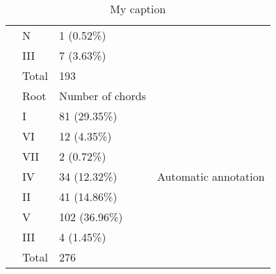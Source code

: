 \begin{table}[]
{\begin{tabular}{|l|l|l|l}
 & N & 1 (0.52\%) & \multicolumn{1}{l|}{} \\ \cline{2-3}
 & III & 7 (3.63\%) & \multicolumn{1}{l|}{} \\ \cline{2-3}
 & Total & 193 & \multicolumn{1}{l|}{} \\ \cline{2-4}
 & Root & Number of chords & \multirow{9}{*}{Automatic annotation} \\ \cline{2-3}
 & I & 81 (29.35\%) &  \\ \cline{2-3}
 & VI & 12 (4.35\%) &  \\ \cline{2-3}
 & VII & 2 (0.72\%) &  \\ \cline{2-3}
 & IV & 34 (12.32\%) &  \\ \cline{2-3}
 & II & 41 (14.86\%) &  \\ \cline{2-3}
 & V & 102 (36.96\%) &  \\ \cline{2-3}
 & III & 4 (1.45\%) &  \\ \cline{2-3}
 & Total & 276 &  \\ \cline{1-3}
\end{tabular}
}
\caption{My caption}
\label{my-label}
\end{table}

\newpage
